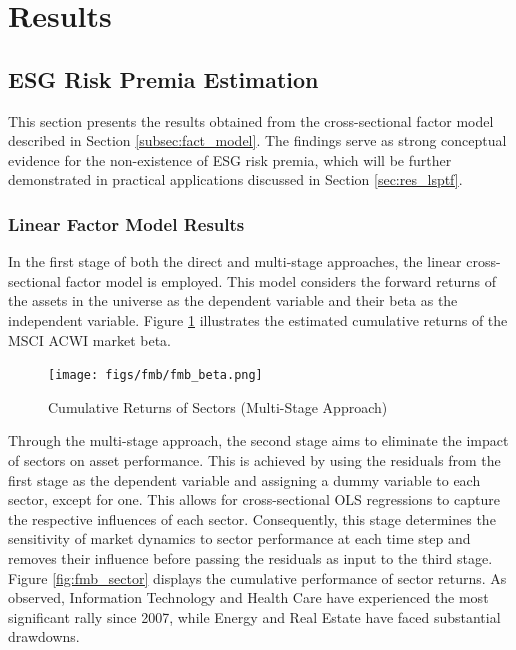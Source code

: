 \documentclass[11pt,a4paper]{article}
\begin{document}
\clearpage

\section{Results}

\subsection{ESG Risk Premia Estimation}\label{sec:res_factor}

This section presents the results obtained from the cross-sectional factor model described in Section \ref{subsec:fact_model}. The findings serve as strong conceptual evidence for the non-existence of ESG risk premia, which will be further demonstrated in practical applications discussed in Section \ref{sec:res_lsptf}. 

\subsubsection{Linear Factor Model Results}

In the first stage of both the direct and multi-stage approaches, the linear cross-sectional factor model is employed. This model considers the forward returns of the assets in the universe as the dependent variable and their beta as the independent variable.
Figure \ref{fig:fmb_beta} illustrates the estimated cumulative returns of the MSCI ACWI market beta.

\begin{figure}[h!] 
    \centering
    \texttt{[image: figs/fmb/fmb\_beta.png]}
    \caption{Cumulative Returns of Sectors (Multi-Stage Approach)}
    \label{fig:fmb_beta}
\end{figure}

Through the multi-stage approach, the second stage aims to eliminate the impact of sectors on asset performance. 
This is achieved by using the residuals from the first stage as the dependent variable and assigning a dummy variable to each sector, except for one. 
This allows for cross-sectional OLS regressions to capture the respective influences of each sector. 
Consequently, this stage determines the sensitivity of market dynamics to sector performance at each time step and removes their influence before passing the residuals as input to the third stage.
Figure \ref{fig:fmb_sector} displays the cumulative performance of sector returns. 
As observed, Information Technology and Health Care have experienced the most significant rally since 2007, while Energy and Real Estate have faced substantial drawdowns.
\end{document}
